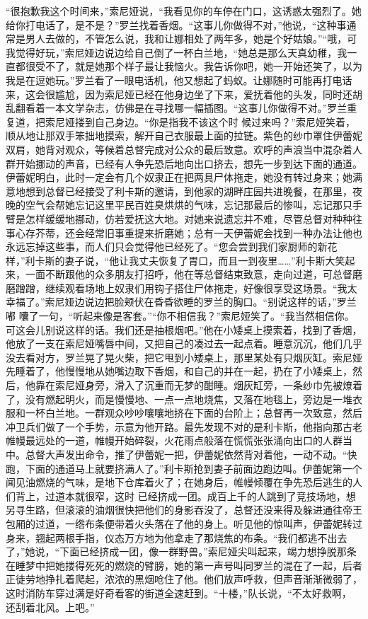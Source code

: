 \documentclass{article}
\begin{document}
“很抱歉我这个时间来，”索尼娅说，“我看见你的车停在门口，这诱惑太强烈了。她给你打电话了，是不是？”罗兰找着香烟。“这事儿你做得不对，”他说，“这种事通常是男人去做的，不管怎么说，我和让娜相处了两年多，她是个好姑娘。”“哦，可我觉得好玩，”索尼娅边说边给自己倒了一杯白兰地，“她总是那么天真幼稚，我一直都很受不了，就是她那个样子最让我恼火。我告诉你吧，她一开始还笑了，以为我是在逗她玩。”罗兰看了一眼电话机，他又想起了蚂蚁。让娜随时可能再打电话来，这会很尴尬，因为索尼娅已经在他身边坐了下来，爱抚着他的头发，同时还胡乱翻看着一本文学杂志，仿佛是在寻找哪一幅插图。“这事儿你做得不对。”罗兰重复道，把索尼娅搂到自己身边。“你是指我不该这个时
\newpage
候过来吗？”索尼娅笑着，顺从地让那双手笨拙地摸索，解开自己衣服最上面的拉链。紫色的纱巾罩住伊蕾妮双肩，她背对观众，等候着总督完成对公众的最后致意。欢呼的声浪当中混杂着人群开始挪动的声音，已经有人争先恐后地向出口挤去，想先一步到达下面的通道。伊蕾妮明白，此时一定会有几个奴隶正在把两具尸体拖走，她没有转过身来；她满意地想到总督已经接受了利卡斯的邀请，到他家的湖畔庄园共进晚餐，在那里，夜晚的空气会帮她忘记这里平民百姓臭烘烘的气味，忘记那最后的惨叫，忘记那只手臂是怎样缓缓地挪动，仿若爱抚这大地。对她来说遗忘并不难，尽管总督对种种往事心存芥蒂，还会经常旧事重提来折磨她；总有一天伊蕾妮会找到一种办法让他也永远忘掉这些事，而人们只会觉得他已经死了。“您会尝到我们家厨师的新花样，”利卡斯的妻子说，“他让我丈夫恢复了胃口，而且一到夜里……”利卡斯大笑起来，一面不断跟他的众多朋友打招呼，他在等总督结束致意，走向过道，可总督磨磨蹭蹭，继续观看场地上奴隶们用钩子搭住尸体拖走，好像很享受这场景。“我太幸福了。”索尼娅边说边把脸颊伏在昏昏欲睡的罗兰的胸口。“别说这样的话，”罗兰嘟
\newpage
囔了一句，“听起来像是客套。”“你不相信我？”索尼娅笑了。“我当然相信你。可这会儿别说这样的话。我们还是抽根烟吧。”他在小矮桌上摸索着，找到了香烟，他放了一支在索尼娅嘴唇中间，又把自己的凑过去一起点着。睡意沉沉，他们几乎没去看对方，罗兰晃了晃火柴，把它甩到小矮桌上，那里某处有只烟灰缸。索尼娅先睡着了，他慢慢地从她嘴边取下香烟，和自己的并在一起，扔在了小矮桌上，然后，他靠在索尼娅身旁，滑入了沉重而无梦的酣睡。烟灰缸旁，一条纱巾先被燎着了，没有燃起明火，而是慢慢地、一点一点地烧焦，又落在地毯上，旁边是一堆衣服和一杯白兰地。一群观众吵吵嚷嚷地挤在下面的台阶上；总督再一次致意，然后冲卫兵们做了一个手势，示意为他开路。最先发现不对的是利卡斯，他指向那古老帷幔最远处的一道，帷幔开始碎裂，火花雨点般落在慌慌张张涌向出口的人群当中。总督大声发出命令，推了伊蕾妮一把，伊蕾妮依然背对着他，一动不动。“快跑，下面的通道马上就要挤满人了。”利卡斯抢到妻子前面边跑边叫。伊蕾妮第一个闻见油燃烧的气味，是地下仓库着火了；在她身后，帷幔倾覆在争先恐后逃生的人们背上，过道本就很窄，这时
\newpage
已经挤成一团。成百上千的人跳到了竞技场地，想另寻生路，但滚滚的油烟很快把他们的身影吞没了，总督还没来得及躲进通往帝王包厢的过道，一绺布条便带着火头落在了他的身上。听见他的惊叫声，伊蕾妮转过身来，翘起两根手指，仪态万方地为他拿走了那烧焦的布条。“我们都逃不出去了，”她说，“下面已经挤成一团，像一群野兽。”索尼娅尖叫起来，竭力想挣脱那条在睡梦中把她搂得死死的燃烧的臂膀，她的第一声号叫同罗兰的混在了一起，后者正徒劳地挣扎着爬起，浓浓的黑烟呛住了他。他们放声呼救，但声音渐渐微弱了，这时消防车穿过满是好奇看客的街道全速赶到。“十楼，”队长说，“不太好救啊，
还刮着北风。上吧。” 
\end{document}
